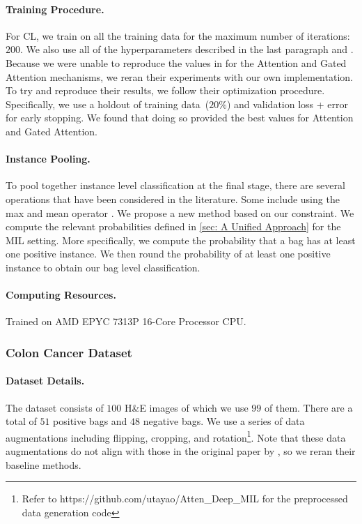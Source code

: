 \documentclass{article}
\begin{document}
\paragraph{Training Procedure.} For CL, we train on all the training data for the maximum number of iterations: $200$. We also use all of the hyperparameters described in the last paragraph and \citet{ilse2018attention}. Because we were unable to reproduce the values in \citet{ilse2018attention} for the Attention and Gated Attention mechanisms, we reran their experiments with our own implementation. To try and reproduce their results, we follow their optimization procedure. Specifically, we use a holdout of training data~($20 \%$) and validation loss + error for early stopping. We found that doing so provided the best values for Attention and Gated Attention.

\paragraph{Instance Pooling.}To pool together instance level classification at the final stage, there are several operations that have been considered in the literature. Some include using the max and mean operator \cite{wang2018revisiting}. We propose a new method based on our constraint. We compute the relevant probabilities defined in \ref{sec: A Unified Approach} for the MIL setting. More specifically, we compute the probability that a bag has at least one positive instance. We then round the probability of at least one positive instance to obtain our bag level classification.

\paragraph{Computing Resources.} Trained on AMD EPYC 7313P 16-Core Processor CPU.

\subsubsection{Colon Cancer Dataset}
\paragraph{Dataset Details.} The dataset consists of $100$ H\&E images of which we use $99$ of them. There are a total of $51$ positive bags and $48$ negative bags. We use a series of data augmentations including flipping, cropping, and rotation\footnote{Refer to https:\slash \slash github.com\slash utayao\slash Atten\_Deep\_MIL for the preprocessed data generation code}. Note that these data augmentations do not align with those in the original paper by \citet{ilse2018attention}, so we reran their baseline methods.
\end{document}
